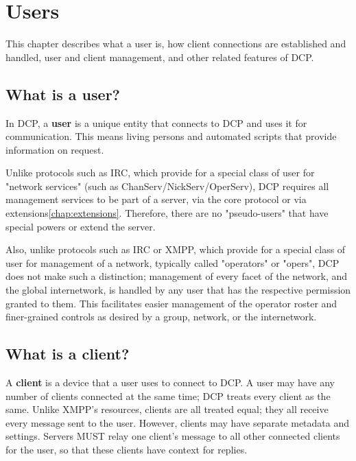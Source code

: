 \chapter{Users}
\label{chap:users}

This chapter describes what a user is, how client connections are established
and handled, user and client management, and other related features of DCP.



\section{What is a user?}
\sectionrule

In DCP, a \textbf{user} is a unique entity that connects to DCP and uses it for
communication.  This means living persons and automated scripts that provide
information on request.

Unlike protocols such as IRC\cite{rfc1459}, which provide for a special class of
user for "network services" (such as ChanServ/NickServ/OperServ), DCP requires
all management services to be part of a server, via the core protocol or via
extensions\ref{chap:extensions}.  Therefore, there are no "pseudo-users" that
have special powers or extend the server.

Also, unlike protocols such as IRC or XMPP\cite{xmpp}, which provide for a
special class of user for management of a network, typically called "operators"
or "opers", DCP does not make such a distinction; management of every facet of
the network, and the global internetwork, is handled by any user that has the
respective permission granted to them.  This facilitates easier management of
the operator roster and finer-grained controls as desired by a group, network,
or the internetwork.



\section{What is a client?}
\sectionrule

A \textbf{client} is a device that a user uses to connect to DCP.  A user may
have any number of clients connected at the same time; DCP treats every client
as the same.  Unlike XMPP's resources, clients are all treated equal; they all
receive every message sent to the user.  However, clients may have separate
metadata and settings.  Servers MUST relay one client's message to all other
connected clients for the user, so that these clients have context for replies.

